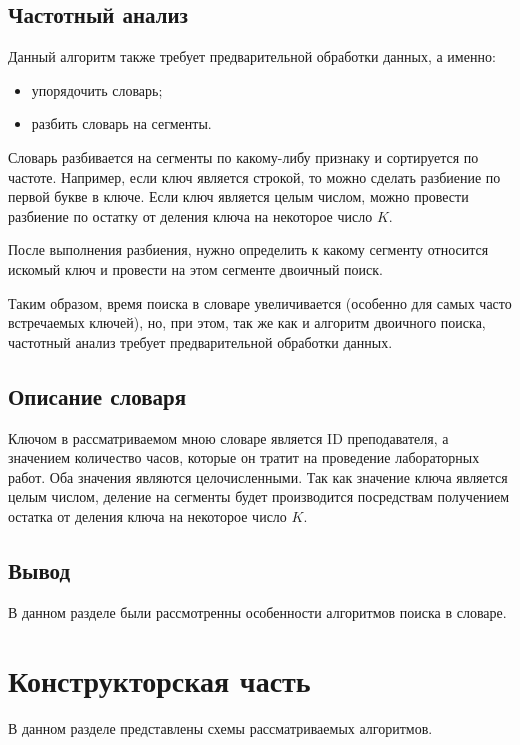 \documentclass[12pt]{report}
\begin{document}
	\section{Частотный анализ}
	
	Данный алгоритм также требует предварительной обработки данных, а именно:
	
	\begin{itemize}
		\item упорядочить словарь;
		\item разбить словарь на сегменты.
	\end{itemize}
	
	Словарь разбивается на сегменты по какому-либу признаку и сортируется по частоте. Например, если ключ является строкой, то можно сделать разбиение по первой букве в ключе. Если ключ является целым числом, можно провести разбиение по остатку от деления ключа на некоторое число $K$.
	
	После выполнения разбиения, нужно определить к какому сегменту относится искомый ключ и провести на этом сегменте двоичный поиск.
	
	Таким образом, время поиска в словаре увеличивается (особенно для самых часто встречаемых ключей), но, при этом, так же как и алгоритм двоичного поиска, частотный анализ требует предварительной обработки данных. 
	
	\section{Описание словаря}
	
	Ключом в рассматриваемом мною словаре является ID преподавателя, а значением количество часов, которые он тратит на проведение лабораторных работ. Оба значения являются целочисленными. Так как значение ключа является целым числом, деление на сегменты будет производится посредствам получением остатка от деления ключа на некоторое число $K$.
	
	\section*{Вывод}
	В данном разделе были рассмотренны особенности алгоритмов поиска в словаре.
	
\chapter{Конструкторская часть}
	
В данном разделе представлены схемы рассматриваемых алгоритмов.
	
\end{document}
